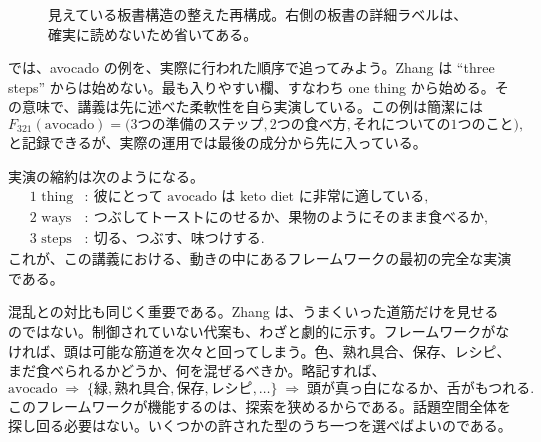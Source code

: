 \begin{figure}[h]
\centering
{}
\caption{見えている板書構造の整えた再構成。右側の板書の詳細ラベルは、確実に読めないため省いてある。}
\end{figure}

では、avocado の例を、実際に行われた順序で追ってみよう。Zhang は ``three steps'' からは始めない。最も入りやすい欄、すなわち one thing から始める。その意味で、講義は先に述べた柔軟性を自ら実演している。この例は簡潔には
\begin{equation}
F_{321}(\text{avocado})
=
\bigl(
\text{3つの準備のステップ},
\text{2つの食べ方},
\text{それについての1つのこと}
\bigr),
\end{equation}
と記録できるが、実際の運用では最後の成分から先に入っている。

実演の縮約は次のようになる。
\begin{align}
\text{1 thing} &:\ \text{彼にとって avocado は keto diet に非常に適している},\\
\text{2 ways} &:\ \text{つぶしてトーストにのせるか、果物のようにそのまま食べるか},\\
\text{3 steps} &:\ \text{切る、つぶす、味つけする}.
\end{align}
これが、この講義における、動きの中にあるフレームワークの最初の完全な実演である。

混乱との対比も同じく重要である。Zhang は、うまくいった道筋だけを見せるのではない。制御されていない代案も、わざと劇的に示す。フレームワークがなければ、頭は可能な筋道を次々と回ってしまう。色、熟れ具合、保存、レシピ、まだ食べられるかどうか、何を混ぜるべきか。略記すれば、
\begin{equation}
\text{avocado}
\;\Rightarrow\;
\{\text{緑},\text{熟れ具合},\text{保存},\text{レシピ},\ldots\}
\;\Rightarrow\;
\text{頭が真っ白になるか、舌がもつれる}.
\end{equation}
このフレームワークが機能するのは、探索を狭めるからである。話題空間全体を探し回る必要はない。いくつかの許された型のうち一つを選べばよいのである。

